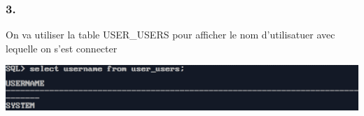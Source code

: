 \subsubsection*{3.}
On va utiliser la table USER\_USERS pour afficher le nom d'utilisatuer avec lequelle on s'est connecter



\begin{center}
    \includegraphics[width=\textwidth]{ScreenShot/Partie5/showUser.png}
\end{center}


